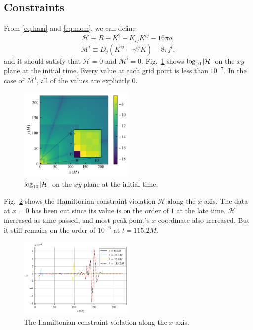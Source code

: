 \documentclass[%
 reprint,
 amsmath,amssymb,
 aps,
 prd,
]{revtex4-2}
\begin{document}
\subsection{Constraints}

From \eqref{eq:ham} and \eqref{eq:mom}, we can define
\begin{equation}
	\mathcal{H} \equiv R + K^2 - K_{ij}K^{ij} - 16\pi \rho,
\end{equation}
\begin{equation}
	\mathcal{M}^i \equiv D_j (K^{ij} - \gamma^{ij}K) - 8\pi j^i,
\end{equation}
and it should satisfy that $\mathcal{H} = 0$ and $\mathcal{M}^i = 0$. Fig.~\ref{fig:ham_xy} shows $\log_{10}\qty|\mathcal{H}|$ on the $xy$ plane at the initial time. Every value at each grid point is less than $10^{-7}$. In the case of $\mathcal{M}^i$, all of the values are explicitly 0.

\begin{figure}[h]
	\includegraphics[width=0.5\textwidth]{data/ham_xy.png}%
	\caption{\label{fig:ham_xy} $\log_{10}\qty|\mathcal{H}|$ on the $xy$ plane at the initial time.}
\end{figure}

Fig.~\ref{fig:ham_evol} shows the Hamiltonian constraint violation $\mathcal{H}$ along the $x$ axis. The data at $x=0$ has been cut since its value is on the order of $1$ at the late time. $\mathcal{H}$ increased as time passed, and most peak point's $x$ coordinate also increased. But it still remains on the order of $10^{-6}$ at $t=115.2M$.
\begin{figure}[h]
	\includegraphics[width=0.5\textwidth]{data/ham_evol.png}%
	\caption{\label{fig:ham_evol} The Hamiltonian constraint violation along the $x$ axis.}
\end{figure}
\end{document}
